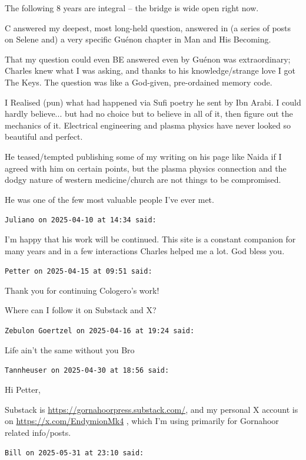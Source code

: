 \begin{footnotesize}
\begin{sffamily}
The following 8 years are integral -- the bridge is wide open right now.

C answered my deepest, most long-held question, answered in (a series of posts on Selene and) a very specific Guénon chapter in Man and His Becoming.

That my question could even BE answered even by Guénon was extraordinary; Charles knew what I was asking, and thanks to his knowledge/strange love I got The Keys. The question was like a God-given, pre-ordained memory code.

I Realised (pun) what had happened via Sufi poetry he sent by Ibn Arabi. I could hardly believe... but had no choice but to believe in all of it, then figure out the mechanics of it. Electrical engineering and plasma physics have never looked so beautiful and perfect.

He teased/tempted publishing some of my writing on his page like Naida if I agreed with him on certain points, but the plasma physics connection and the dodgy nature of western medicine/church are not things to be compromised.

He was one of the few most valuable people I've ever met.

\hfill

\texttt{Juliano on 2025-04-10 at 14:34 said:}

I'm happy that his work will be continued. This site is a constant companion for many years and in a few interactions Charles helped me a lot. God bless you.

\hfill

\texttt{Petter on 2025-04-15 at 09:51 said:}

Thank you for continuing Cologero's work!

Where can I follow it on Substack and X?

\hfill

\texttt{Zebulon Goertzel on 2025-04-16 at 19:24 said:}

Life ain't the same without you Bro

\hfill

\texttt{Tannheuser on 2025-04-30 at 18:56 said:}

Hi Petter,

Substack is \url{https://gornahoorpress.substack.com/}, and my personal X account is on \url{https://x.com/EndymionMk4} , which I'm using primarily for Gornahoor related info/posts.

\hfill

\texttt{Bill on 2025-05-31 at 23:10 said:}


\end{sffamily}
\end{footnotesize}
